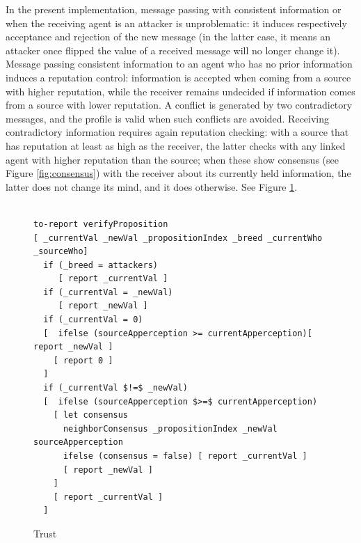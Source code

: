 \documentclass[compsoc, conference, letterpaper, 10pt, times]{IEEEtran}
\begin{document}
In the present implementation, message passing with consistent information or when the receiving agent is an attacker is unproblematic: it induces respectively acceptance and rejection of the new message (in the latter case, it means an attacker once flipped the value of a received message will no longer change it). Message passing consistent information to an agent who has no prior information induces a reputation control: information is accepted when coming from a source with higher reputation, while the receiver remains undecided if information comes from a source with lower reputation. A conflict is generated by two contradictory messages, and the profile is valid when such conflicts are avoided. Receiving contradictory information requires again reputation checking: with a source that has reputation at least as high as the receiver, the latter checks with any linked agent with higher reputation than the source; when these show consensus (see Figure \ref{fig:consensus}) with the receiver about its currently held information, the latter does not change its mind, and it does otherwise. See Figure \ref{fig:passing1}.


\begin{figure}[t]
 	\lstset{language=Java,
 		basicstyle=\scriptsize,
 		mathescape}
 	\begin{lstlisting}[frame=single]  % Start your code-block

to-report verifyProposition
[ _currentVal _newVal _propositionIndex _breed _currentWho _sourceWho]
  if (_breed = attackers)
     [ report _currentVal ]
  if (_currentVal = _newVal)
     [ report _newVal ]
  if (_currentVal = 0)
  [  ifelse (sourceApperception >= currentApperception)[ report _newVal ]
    [ report 0 ]
  ]
  if (_currentVal $!=$ _newVal)
  [  ifelse (sourceApperception $>=$ currentApperception)
    [ let consensus
      neighborConsensus _propositionIndex _newVal sourceApperception
      ifelse (consensus = false) [ report _currentVal ]
      [ report _newVal ]
    ]
    [ report _currentVal ]
  ]
  \end{lstlisting}
  \caption{Trust}\label{fig:passing1}
\end{figure}
\end{document}
